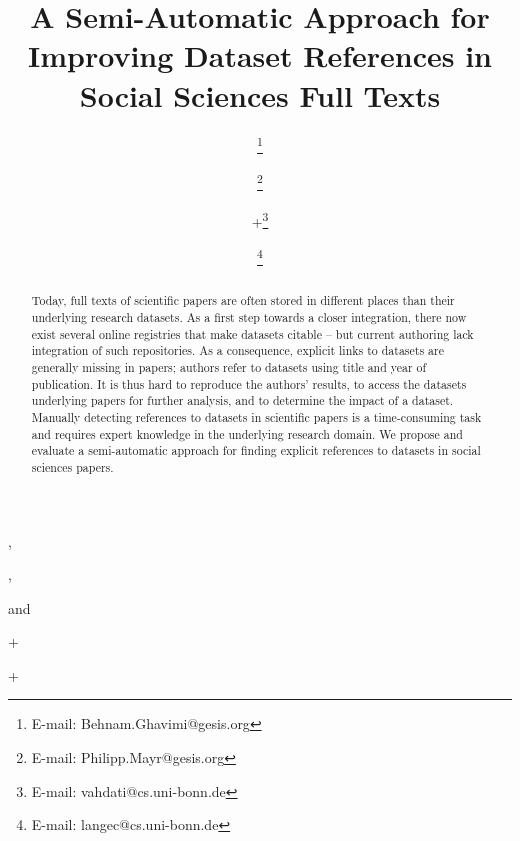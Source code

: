 \documentclass{IOS-Book-Article}
\begin{document}
\pagestyle{headings}
\def\thepage{}

\begin{frontmatter}
\title{A Semi-Automatic Approach for Improving Dataset References in Social Sciences Full Texts}

\author[A,B]{ 
\thanks{E-mail: Behnam.Ghavimi@gesis.org}},
\author[A]{ 
\thanks{E-mail: Philipp.Mayr@gesis.org}},
\author[B]{ 
+\thanks{E-mail: vahdati@cs.uni-bonn.de}}
and
\author[B,C]{  
\thanks{E-mail: langec@cs.uni-bonn.de}}

\address[A]{GESIS – Leibniz Institute for the Social Sciences}
+\address[B]{Enterprise Information Systems (EIS), University of Bonn}
+\address[C]{Fraunhofer Institute for Intelligent Analysis and Information Systems IAIS}
\begin{abstract}
Today, full texts of scientific papers are often stored in different places than their underlying research datasets.
As a first step towards a closer integration, there now exist several online registries that make datasets citable – but current authoring lack integration of such repositories. 
As a consequence, explicit links to datasets are generally missing in papers; authors refer to datasets using title and year of publication.
It is thus hard to reproduce the authors' results, to access the datasets underlying papers for further analysis, and to determine the impact of a dataset.
Manually detecting references to datasets in scientific papers is a time-consuming task and requires expert knowledge in the underlying research domain. 
We propose and evaluate a semi-automatic approach for finding explicit references to datasets in social sciences papers.


\end{abstract}
\end{frontmatter}
\end{document}
